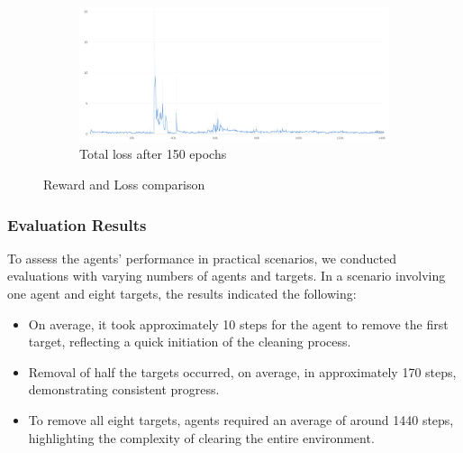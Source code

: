 \documentclass{scrartcl}
\begin{document}
\begin{figure}
\begin{subfigure}[b]{0.45\textwidth}
      \label{fig:s_ser}
  \end{subfigure}
  \hfill
  \begin{subfigure}[b]{0.45\textwidth}
      \centering
      \includegraphics[width=\textwidth]{img/loss.png}
      \caption{Total loss after 150 epochs} 
      \label{fig:s_msps}
  \end{subfigure}
  \caption{Reward and Loss comparison}
  \label{fig:s}
\end{figure}

\subsubsection{Evaluation Results}

To assess the agents' performance in practical scenarios, we conducted evaluations with varying numbers of agents and targets. In a scenario involving one agent and eight targets, the results indicated the following:
\begin{itemize}
  \item On average, it took approximately 10 steps for the agent to remove the first target, reflecting a quick initiation of the cleaning process.
  \item Removal of half the targets occurred, on average, in approximately 170 steps, demonstrating consistent progress.
  \item To remove all eight targets, agents required an average of around 1440 steps, highlighting the complexity of clearing the entire environment.
\end{itemize}
\end{document}
